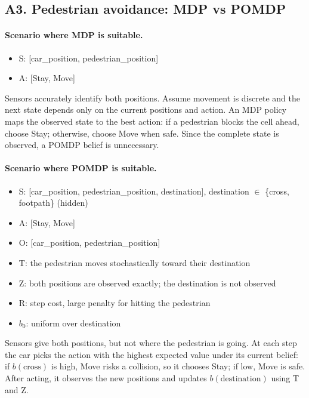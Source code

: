 \documentclass[11pt,a4paper]{article}
\begin{document}
\subsection*{A3. Pedestrian avoidance: MDP vs POMDP}

\paragraph{Scenario where MDP is suitable.}
\begin{itemize}[nosep]
  \item S: [car\_position, pedestrian\_position]
  \item A: [Stay, Move]
\end{itemize}
Sensors accurately identify both positions. Assume movement is discrete and the next state depends only on the current positions and action. An MDP policy maps the observed state to the best action: if a pedestrian blocks the cell ahead, choose Stay; otherwise, choose Move when safe. Since the complete state is observed, a POMDP belief is unnecessary.

\paragraph{Scenario where POMDP is suitable.}
\begin{itemize}[nosep]
  \item S: [car\_position, pedestrian\_position, destination], destination $\in$ \{cross, footpath\} (hidden)
  \item A: [Stay, Move]
  \item O: [car\_position, pedestrian\_position]
  \item T: the pedestrian moves stochastically toward their destination
  \item Z: both positions are observed exactly; the destination is not observed
  \item R: step cost, large penalty for hitting the pedestrian
  \item $b_0$: uniform over destination
\end{itemize}
Sensors give both positions, but not where the pedestrian is going. At each step the car picks the action with the highest expected value under its current belief: if $b(\text{cross})$ is high, Move risks a collision, so it chooses Stay; if low, Move is safe. After acting, it observes the new positions and updates $b(\text{destination})$ using T and Z.
\end{document}
